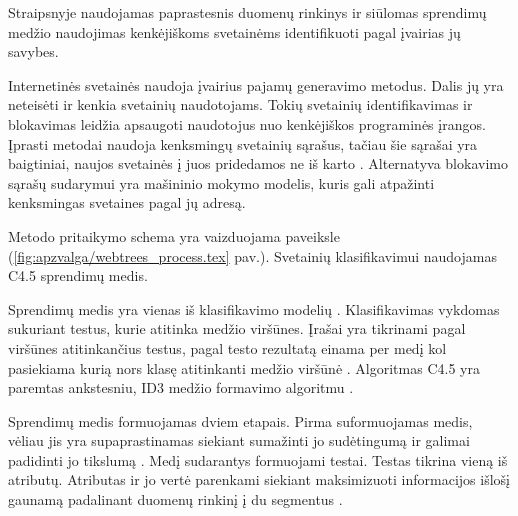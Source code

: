Straipsnyje  naudojamas paprastesnis duomenų rinkinys ir siūlomas sprendimų medžio naudojimas kenkėjiškoms svetainėms identifikuoti pagal įvairias jų savybes.

Internetinės svetainės naudoja įvairius pajamų generavimo metodus. Dalis jų yra neteisėti ir kenkia svetainių naudotojams. Tokių svetainių identifikavimas ir blokavimas leidžia apsaugoti naudotojus nuo kenkėjiškos programinės įrangos. Įprasti metodai naudoja kenksmingų svetainių sąrašus, tačiau šie sąrašai yra baigtiniai, naujos svetainės į juos pridedamos ne iš karto \cite{trees}. Alternatyva blokavimo sąrašų sudarymui yra mašininio mokymo modelis, kuris gali atpažinti kenksmingas svetaines pagal jų adresą.


Metodo pritaikymo schema yra vaizduojama paveiksle (\vref{fig:apzvalga/webtrees_process.tex} pav.). Svetainių klasifikavimui naudojamas C4.5 sprendimų medis.


Sprendimų medis yra vienas iš klasifikavimo modelių \cite{c45}. Klasifikavimas vykdomas sukuriant testus, kurie atitinka medžio viršūnes. Įrašai yra tikrinami pagal viršūnes atitinkančius testus, pagal testo rezultatą einama per medį kol pasiekiama kurią nors klasę atitinkanti medžio viršūnė \cite{trees}. Algoritmas C4.5 yra paremtas ankstesniu, ID3 medžio formavimo algoritmu \cite{c45}.

Sprendimų medis formuojamas dviem etapais. Pirma suformuojamas medis, vėliau jis yra supaprastinamas siekiant sumažinti jo sudėtingumą ir galimai padidinti jo tikslumą \cite{c45}. Medį sudarantys formuojami testai. Testas tikrina vieną iš atributų. Atributas ir jo vertė parenkami siekiant maksimizuoti informacijos išlošį gaunamą padalinant duomenų rinkinį į du segmentus \cite{Wu2008}.

